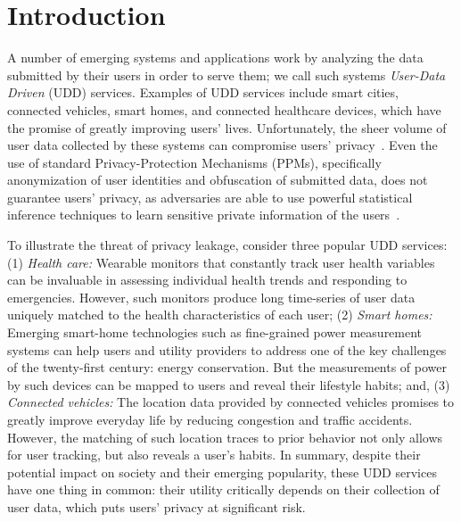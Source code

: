 \section{Introduction}
\label{intro}

A number of emerging systems and applications work by analyzing the data submitted by their users in order to serve them; we call such systems \emph{User-Data Driven} (UDD) services. Examples of UDD services include smart cities, connected vehicles, smart homes, and connected healthcare devices, which have the promise of greatly improving users' lives. Unfortunately, the sheer volume of user data collected by these systems can compromise users' privacy~\cite{FTC2015}. Even the use of standard Privacy-Protection Mechanisms (PPMs), specifically anonymization of user identities and obfuscation of submitted data, does not guarantee users' privacy, as adversaries are able to use powerful statistical inference techniques to learn sensitive private information of the users~\cite{0Quest2016, 3ukil2014iot, 4Hosseinzadeh2014,iotCastle,matching}.

To illustrate the threat of privacy leakage, consider three popular UDD services: (1) {\em Health care:}  Wearable monitors that constantly track user health variables can be invaluable in assessing individual health trends and responding to emergencies.  However, such monitors produce long time-series of user data uniquely matched to the health characteristics of each user; (2) {\em Smart homes:} Emerging smart-home technologies such as fine-grained power measurement systems can help users and utility providers to address one of the key challenges of the twenty-first century:  energy conservation.  But the measurements of power by such devices can be mapped to users and reveal their lifestyle habits; and, (3) {\em Connected vehicles:}  The location data provided by connected vehicles promises to greatly improve everyday life by reducing congestion and traffic accidents.  However, the matching of such location traces to prior behavior not only allows for user tracking, but also reveals a user's habits.  In summary, despite their potential impact on society and their emerging popularity, these UDD services have one thing in common: their utility critically depends on their collection of user data, which puts users' privacy at significant risk.


